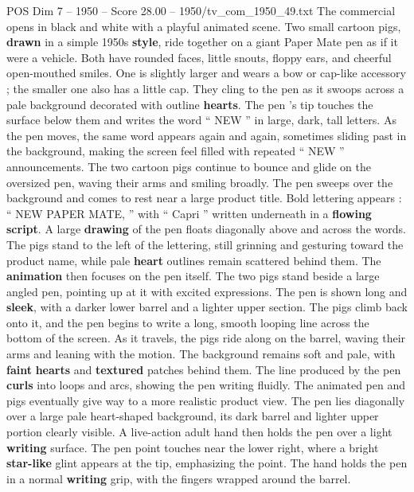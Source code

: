 \begin{textsample}{POS Dim 7 – 1950 – Score 28.00 – 1950/tv\_com\_1950\_49.txt}  \label{ex:f7_pos_002}
The commercial opens in black and white with a playful animated scene.
Two small cartoon pigs, \textbf{drawn} in a simple 1950s \textbf{style}, ride together on a giant Paper Mate pen as if it were a vehicle.
Both have rounded faces, little snouts, floppy ears, and cheerful open-mouthed smiles.
One is slightly larger and wears a bow or cap-like accessory ; the smaller one also has a little cap.
They cling to the pen as it swoops across a pale background decorated with outline \textbf{hearts}.
The pen ’s tip touches the surface below them and writes the word “ NEW ” in large, dark, tall letters.
As the pen moves, the same word appears again and again, sometimes sliding past in the background, making the screen feel filled with repeated “ NEW ” announcements.
The two cartoon pigs continue to bounce and glide on the oversized pen, waving their arms and smiling broadly.
The pen sweeps over the background and comes to rest near a large product title.
Bold lettering appears : “ NEW PAPER MATE, ” with “ Capri ” written underneath in a \textbf{flowing} \textbf{script}.
A large \textbf{drawing} of the pen floats diagonally above and across the words.
The pigs stand to the left of the lettering, still grinning and gesturing toward the product name, while pale \textbf{heart} outlines remain scattered behind them.
The \textbf{animation} then focuses on the pen itself.
The two pigs stand beside a large angled pen, pointing up at it with excited expressions.
The pen is shown long and \textbf{sleek}, with a darker lower barrel and a lighter upper section.
The pigs climb back onto it, and the pen begins to write a long, smooth looping line across the bottom of the screen.
As it travels, the pigs ride along on the barrel, waving their arms and leaning with the motion.
The background remains soft and pale, with \textbf{faint} \textbf{hearts} and \textbf{textured} patches behind them.
The line produced by the pen \textbf{curls} into loops and arcs, showing the pen writing fluidly.
The animated pen and pigs eventually give way to a more realistic product view.
The pen lies diagonally over a large pale heart-shaped background, its dark barrel and lighter upper portion clearly visible.
A live-action adult hand then holds the pen over a light \textbf{writing} surface.
The pen point touches near the lower right, where a bright \textbf{star-like} glint appears at the tip, emphasizing the point.
The hand holds the pen in a normal \textbf{writing} grip, with the fingers wrapped around the barrel.

\end{textsample}
